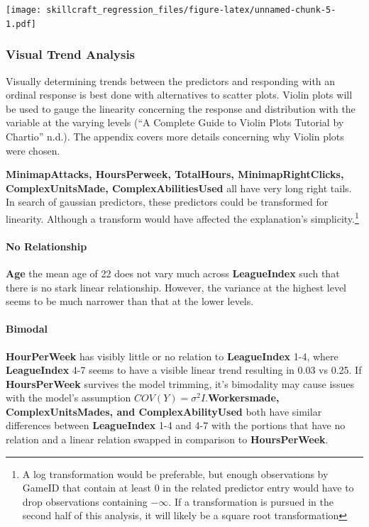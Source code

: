 \documentclass[]{article}
\let\oldparagraph\paragraph
\renewcommand{\paragraph}[1]{\oldparagraph{#1}\mbox{}}
\begin{document}
\texttt{[image: skillcraft\_regression\_files/figure-latex/unnamed-chunk-5-1.pdf]}

\hypertarget{visual-trend-analysis}{%
\subsubsection{Visual Trend Analysis}\label{visual-trend-analysis}}

Visually determining trends between the predictors and responding with
an ordinal response is best done with alternatives to scatter plots.
Violin plots will be used to gauge the linearity concerning the response
and distribution with the variable at the varying levels (``A Complete
Guide to Violin Plots \textbar{} Tutorial by Chartio'' n.d.). The
appendix covers more details concerning why Violin plots were chosen.

\textbf{MinimapAttacks, HoursPerweek, TotalHours, MinimapRightClicks,
ComplexUnitsMade, ComplexAbilitiesUsed} all have very long right tails.
In search of gaussian predictors, these predictors could be transformed
for linearity. Although a transform would have affected the
explanation's simplicity.\footnote{A log transformation would be
  preferable, but enough observations by GameID that contain at least 0
  in the related predictor entry would have to drop observations
  containing \(-\infty\). If a transformation is pursued in the second
  half of this analysis, it will likely be a square root transformation}

\hypertarget{no-relationship}{%
\paragraph{No Relationship}\label{no-relationship}}

\textbf{Age} the mean age of 22 does not vary much across
\textbf{LeagueIndex} such that there is no stark linear relationship.
However, the variance at the highest level seems to be much narrower
than that at the lower levels.

\hypertarget{bimodal}{%
\paragraph{Bimodal}\label{bimodal}}

\textbf{HourPerWeek} has visibly little or no relation to
\textbf{LeagueIndex} 1-4, where \textbf{LeagueIndex} 4-7 seems to have a
visible linear trend resulting in 0.03 vs 0.25. If \textbf{HoursPerWeek}
survives the model trimming, it's bimodality may cause issues with the
model's assumption \(COV(Y)=\sigma^2I\).\textbf{Workersmade,
ComplexUnitsMades, and ComplexAbilityUsed} both have similar differences
between \textbf{LeagueIndex} 1-4 and 4-7 with the portions that have no
relation and a linear relation swapped in comparison to
\textbf{HoursPerWeek}.
\end{document}
